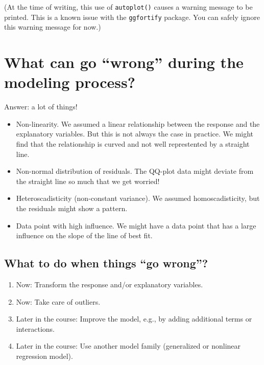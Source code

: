 \documentclass[
  letterpaper,
  8pt,
  a4paper]{book}
\providecommand{\tightlist}{%
  \setlength{\itemsep}{0pt}\setlength{\parskip}{0pt}}
\begin{document}
(At the time of writing, this use of \texttt{autoplot()} causes a
warning message to be printed. This is a known issue with the
\texttt{ggfortify} package. You can safely ignore this warning message
for now.)

\section*{What can go ``wrong'' during the modeling
process?}\label{what-can-go-wrong-during-the-modeling-process}


Answer: a lot of things!

\begin{itemize}
\tightlist
\item
  Non-linearity. We assumed a linear relationship between the response
  and the explanatory variables. But this is not always the case in
  practice. We might find that the relationship is curved and not well
  represtented by a straight line.
\item
  Non-normal distribution of residuals. The QQ-plot data might deviate
  from the straight line so much that we get worried!
\item
  Heteroscadisticity (non-constant variance). We assumed
  homoscadisticity, but the residuals might show a pattern.
\item
  Data point with high influence. We might have a data point that has a
  large influence on the slope of the line of best fit.
\end{itemize}

\subsection*{What to do when things ``go
wrong''?}\label{what-to-do-when-things-go-wrong}

\begin{enumerate}
\def\labelenumi{\arabic{enumi}.}
\tightlist
\item
  Now: Transform the response and/or explanatory variables.
\item
  Now: Take care of outliers.
\item
  Later in the course: Improve the model, e.g., by adding additional
  terms or interactions.
\item
  Later in the course: Use another model family (generalized or
  nonlinear regression model).
\end{enumerate}
\end{document}

